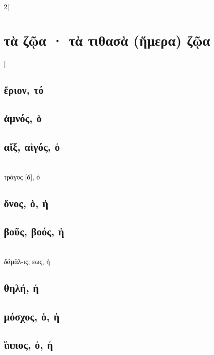 \documentclass{book}
\begin{document}
\begin{multicols}{2}[\section{τὰ ζῷα · τὰ τιθασὰ (ἥμερα) ζῷα}]
\subsection{ἔριον, τό}
\subsection{ἀμνός, ὁ}
\subsection{αἴξ, αἰγός, ὁ}
 ~\\
τράγος [ᾰ], ὁ
\subsection{ὄνος, ὁ, ἡ}
\subsection{βοῦς, βοός, ἡ}
 ~\\
δᾰμᾰλ-ις, εως, ἡ 
\subsection{θηλή, ἡ}
\subsection{μόσχος, ὁ, ἡ}
\subsection{ἵππος, ὁ, ἡ}
~
\end{multicols}
\newpage  
\end{document}
